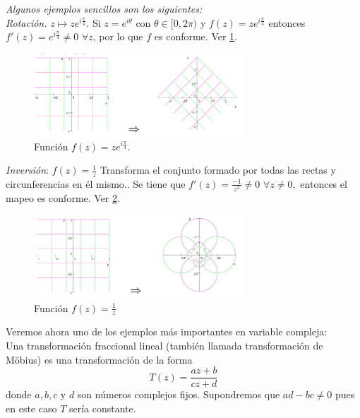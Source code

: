 \documentclass[a4paper]{article}
\begin{document}
\textit{Algunos ejemplos sencillos son los siguientes:}\\
\textit{Rotación.} $z \mapsto ze^{i\frac{\pi}{4}}$. Si $z=e^{i\theta}$ con $\theta \in [0, 2\pi)$ y $f(z)=ze^{i\frac{\pi}{4}}$ entonces $f'(z)=e^{i\frac{\pi}{4}} \neq 0$ $\forall z$, por lo que $f$ es conforme. Ver \ref{fig:fun2}.\\
\begin{figure}
\centering
\includegraphics[width=0.7\textwidth]{fun2.png}
\caption{\label{fig:fun2} Función $f(z)=ze^{i\frac{\pi}{4}}$.}
\end{figure}

\textit{Inversión}: $f(z)=\frac{1}{z}$ Transforma el conjunto formado por todas las rectas y circunferencias en él mismo.. Se tiene que $f'(z)=\frac{-1}{z^{2}}\neq 0$ $\forall z \neq 0,$ entonces el mapeo es conforme. Ver \ref{fig:fun1}.\\
\begin{figure}
\centering
\includegraphics[width=0.7\textwidth]{fun1.jpg}
\caption{\label{fig:fun1} Función $f(z)=\frac{1}{z}$}
\end{figure}

Veremos ahora uno de los ejemplos más importantes en variable compleja:\\
Una transformación fraccional lineal (también llamada transformación de Möbius) es una transformación de la forma $$
T(z)=\frac{az+b}{cz+d} 
$$ donde $a,b,c$ y $d$ son números complejos fijos. Supondremos que $ad-bc \neq 0$ pues en este caso $T$ sería constante.\\
\end{document}
